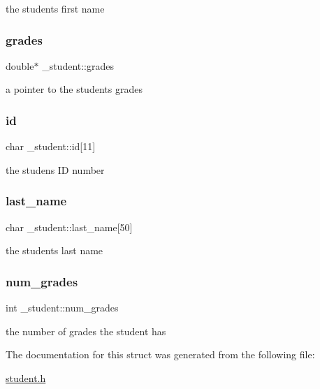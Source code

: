 the student\textquotesingle{}s first name \mbox{\label{struct__student_ad0f75a9ff0f6104eb9e3bb3c4f7ad97b}} 
\subsubsection{\texorpdfstring{grades}{grades}}
{\footnotesize\ttfamily double$\ast$ \+\_\+student\+::grades}

a pointer to the students grades \mbox{\label{struct__student_adaee78078859cdecdbe9128dd655b748}} 
\subsubsection{\texorpdfstring{id}{id}}
{\footnotesize\ttfamily char \+\_\+student\+::id\mbox{[}11\mbox{]}}

the studen\textquotesingle{}s ID number \mbox{\label{struct__student_a18eb2a90671a2292c017b8f4fbde7eec}} 
\subsubsection{\texorpdfstring{last\+\_\+name}{last\_name}}
{\footnotesize\ttfamily char \+\_\+student\+::last\+\_\+name\mbox{[}50\mbox{]}}

the student\textquotesingle{}s last name \mbox{\label{struct__student_a6592ee968ed2226737f45243e7602636}} 
\subsubsection{\texorpdfstring{num\+\_\+grades}{num\_grades}}
{\footnotesize\ttfamily int \+\_\+student\+::num\+\_\+grades}

the number of grades the student has 

The documentation for this struct was generated from the following file\+:\begin{DoxyCompactItemize}
\item 
\mbox{\hyperlink{student_8h}{student.\+h}}\end{DoxyCompactItemize}
